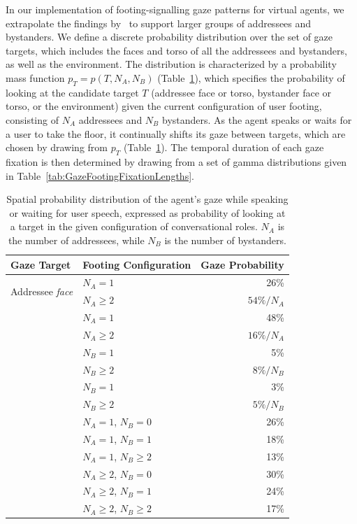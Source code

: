 In our implementation of footing-signalling gaze patterns for virtual agents, we extrapolate the findings by~\citet{mutlu2012conversational} to support larger groups of addressees and bystanders. We define a discrete probability distribution over the set of gaze targets, which includes the faces and torso of all the addressees and bystanders, as well as the environment. The distribution is characterized by a probability mass function $p_T = p(T, N_A, N_B)$ (Table~\ref{tab:GazeFootingSpatial}), which specifies the probability of looking at the candidate target $T$ (addressee face or torso, bystander face or torso, or the environment) given the current configuration of user footing, consisting of $N_A$ addressees and $N_B$ bystanders. As the agent speaks or waits for a user to take the floor, it continually shifts its gaze between targets, which are chosen by drawing from $p_T$ (Table~\ref{tab:GazeFootingSpatial}). The temporal duration of each gaze fixation is then determined by drawing from a set of gamma distributions given in Table~\ref{tab:GazeFootingFixationLengths}.

\begin{table}
\centering
\def\arraystretch{1.5}
\begin{tabular}{|l|l|r|}
\hline
\textbf{Gaze Target} & \textbf{Footing Configuration} & \textbf{Gaze Probability} \\
\hline
\multirow{2}{*}{Addressee \emph{face}} & $N_A = 1$ & 26\% \\
& $N_A \geq 2$ & $54\%/N_A$ \\
\hdashline
\multirow{2}{*}{Addressee \emph{torso}} & $N_A = 1$ & 48\% \\
& $N_A \geq 2$ & $16\%/N_A$ \\
\hdashline
\multirow{2}{*}{Bystander \emph{face}} & $N_B = 1$ & 5\% \\
& $N_B \geq 2$ & $8\%/N_B$ \\
\hdashline
\multirow{2}{*}{Bystander \emph{torso}} & $N_B = 1$ & 3\% \\
& $N_B \geq 2$ & $5\%/N_B$ \\
\hdashline
\multirow{6}{*}{Environment} & $N_A = 1$, $N_B = 0$ & 26\% \\
& $N_A = 1$, $N_B = 1$ & 18\% \\
& $N_A = 1$, $N_B \geq 2$ & 13\% \\
& $N_A \geq 2$, $N_B = 0$ & 30\% \\
& $N_A \geq 2$, $N_B = 1$ & 24\% \\
& $N_A \geq 2$, $N_B \geq 2$ & 17\% \\
\hline
\end{tabular}
\caption{Spatial probability distribution of the agent's gaze while speaking or waiting for user speech, expressed as probability of looking at a target in the given configuration of conversational roles. $N_A$ is the number of addressees, while $N_B$ is the number of bystanders.}
\label{tab:GazeFootingSpatial}
\end{table}

